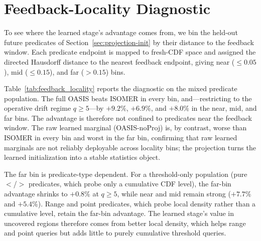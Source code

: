 \documentclass[preprint,12pt]{elsarticle}
\newcommand{\oasisUseMaxWidthResize}[1]{%
  \renewcommand{\resizebox}[3]{\adjustbox{max width=#1}{##3}}%
}
\begin{document}
\appendix

\section{Feedback-Locality Diagnostic}
\label{sec:appendix-locality}

To see where the learned stage's advantage comes from, we bin the held-out
future predicates of Section~\ref{sec:projection-init} by their distance to the
feedback window. Each predicate endpoint is mapped to fresh-CDF space and
assigned the directed Hausdorff distance to the nearest feedback endpoint,
giving near ($\leq 0.05$), mid ($\leq 0.15$), and far ($>0.15$) bins.

\begingroup
\oasisUseMaxWidthResize{.94\textwidth}

\endgroup

Table~\ref{tab:feedback_locality} reports the diagnostic on the mixed predicate
population. The full OASIS beats ISOMER in every bin, and---restricting to the
operative drift regime $q\geq5$---by $+9.2\%$, $+6.9\%$, and $+8.0\%$ in the
near, mid, and far bins. The advantage is therefore not confined to predicates
near the feedback window. The raw learned marginal (OASIS-noProj) is, by
contrast, worse than ISOMER in every bin and worst in the far bin, confirming
that raw learned marginals are not reliably deployable across locality bins; the
projection turns the learned initialization into a stable statistics object.

The far bin is predicate-type dependent. For a threshold-only population (pure
$<$/$>$ predicates, which probe only a cumulative CDF level), the far-bin
advantage shrinks to $+0.8\%$ at $q\geq5$, while near and mid remain strong
($+7.7\%$ and $+5.4\%$). Range and point predicates, which probe local density
rather than a cumulative level, retain the far-bin advantage. The learned
stage's value in uncovered regions therefore comes from better local density,
which helps range and point queries but adds little to purely cumulative
threshold queries.



\end{document}
